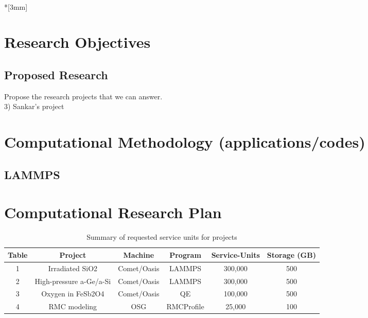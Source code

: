 \documentclass{proposalnsf}
\begin{document}
\\*[3mm]

\renewcommand{\thepage} {\arabic{page}}



\section*{Research Objectives}


\subsection*{Proposed Research}






Propose the research projects that we can answer.  \\
  3) Sankar's project \\





\section*{Computational Methodology (applications/codes)}
\subsection*{LAMMPS}


\section*{Computational Research Plan}

\begin{table}[h!]
  \centering
  \caption{Summary of requested service units for projects}
  \begin{tabular}{cccccc}
  	\toprule
  	Table & Project & Machine & Program & Service-Units & Storage (GB)\\
  	\midrule
  	1 & Irradiated SiO2   & Comet/Oasis & LAMMPS & 300,000 & 500 \\
  	2 & High-pressure a-Ge/a-Si & Comet/Oasis & LAMMPS & 300,000 & 500\\
  	3 & Oxygen in FeSb2O4 & Comet/Oasis & QE & 100,000 & 500\\
  	4 & RMC modeling   & OSG & RMCProfile & 25,000 & 100 \\
  	\bottomrule
  \end{tabular}
\end{table}
\end{document}
